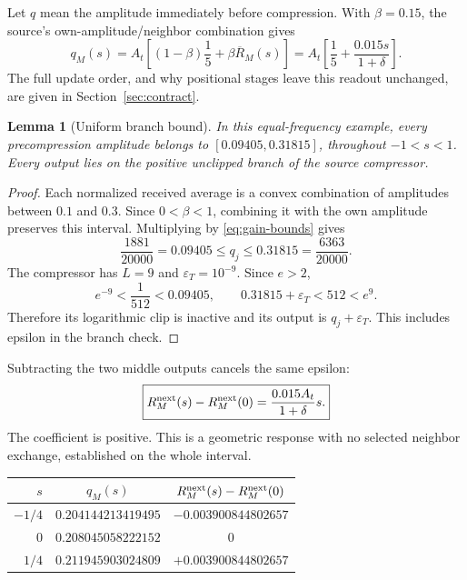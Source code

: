 \documentclass[11pt,a4paper]{article}
\newtheorem{lemma}[theorem]{Lemma}
\theoremstyle{remark}\newtheorem{remark}[theorem]{Remark}
\newcommand{\Rbar}{\overline R}
\numberwithin{equation}{section}
\begin{document}
Let $q$ mean the amplitude immediately before compression. With
$\beta=0.15$, the source's own-amplitude/neighbor combination gives
\begin{equation}
q_M(s)=A_t\left[(1-\beta)\frac15+\beta\Rbar_M(s)\right]
=A_t\left[\frac15+\frac{0.015s}{1+\delta}\right].
\label{eq:three-q}
\end{equation}
The full update order, and why positional stages leave this readout
unchanged, are given in Section~\ref{sec:contract}.

\begin{lemma}[Uniform branch bound]\label{lem:convex}
In this equal-frequency example, every precompression amplitude belongs to
$[0.09405,0.31815]$, throughout $-1<s<1$. Every output lies on the positive
unclipped branch of the source compressor.
\end{lemma}
\begin{proof}
Each normalized received average is a convex combination of amplitudes
between $0.1$ and $0.3$. Since $0<\beta<1$, combining it with the own
amplitude preserves this interval. Multiplying by
\eqref{eq:gain-bounds} gives
\begin{equation}
\frac{1881}{20000}=0.09405\le q_j
\le0.31815=\frac{6363}{20000}.\label{eq:uniform-q}
\end{equation}
The compressor has $L=9$ and $\varepsilon_T=10^{-9}$. Since $e>2$,
\[
e^{-9}<\frac1{512}<0.09405,\qquad
0.31815+\varepsilon_T<512<e^9.
\]
Therefore its logarithmic clip is inactive and its output is
$q_j+\varepsilon_T$. This includes epsilon in the branch check.
\end{proof}

Subtracting the two middle outputs cancels the same epsilon:
\begin{equation}
\boxed{R_M^{\rm next}(s)-R_M^{\rm next}(0)
       =\frac{0.015A_t}{1+\delta}s.}\label{eq:three-output}
\end{equation}
The coefficient is positive. This is a geometric response with no selected
neighbor exchange, established on the whole interval.

\begin{center}
\begin{tabular}{@{}rcc@{}}
\toprule
$s$ & $q_M(s)$ & $R_M^{\rm next}(s)-R_M^{\rm next}(0)$\\
\midrule
$-1/4$ & $0.204144213419495$ & $-0.003900844802657$\\
$0$ & $0.208045058222152$ & $0$\\
$1/4$ & $0.211945903024809$ & $+0.003900844802657$\\
\bottomrule
\end{tabular}
\end{center}
\end{document}
